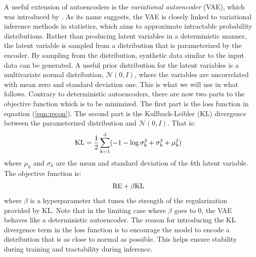 \documentclass[12pt]{article}
\begin{document}
A useful extension of autoencoders is the \textit{variational autoencoder} (VAE), which was introduced by \citet{vae}. As its name suggests, the VAE is closely linked to variational inference methods in statistics, which aims to approximate intractable probability distributions. Rather than producing latent variables in a deterministic manner, the latent variable is sampled from a distribution that is parameterized by the encoder. By sampling from the distribution, synthetic data similar to the input data can be generated. A useful prior distribution for the latent variables is a multivariate normal distribution, $\mathcal{N}(0,I)$, where the variables are uncorrelated with mean zero and standard deviation one. This is what we will use in what follows. Contrary to deterministic autoencoders, there are now two parts to the objective function which is to be minimized. The first part is the loss function in equation (\ref{eqn:recon}). The second part is the Kullback-Leibler (KL) divergence between the parameterized distribution and $\mathcal{N}(0,I)$.  That is:
\begin{align}
\label{eqn:kl}
\rm{KL}=\frac{1}{2}\sum_{k=1}^d (-1 -\log{\sigma_{k}^2} + \sigma_{k}^2 + \mu_{k}^2)
\end{align}
where $\mu_k$ and $\sigma_k$ are the mean and standard deviation of the $k$th latent variable.
The objective function is:
\begin{align}
\label{eqn:obj}
\rm{RE}+\beta\rm{KL}
\end{align}
where $\beta$ is a hyperparameter that tunes the strength of the regularization provided by KL. Note that in the limiting case where $\beta$ goes to 0, the VAE behaves like a deterministic autoencoder. The reason for introducing the KL divergence term in the loss function is to encourage the model to encode a distribution that is as close to normal as possible. This helps ensure stability during training and tractability during inference.
\end{document}
